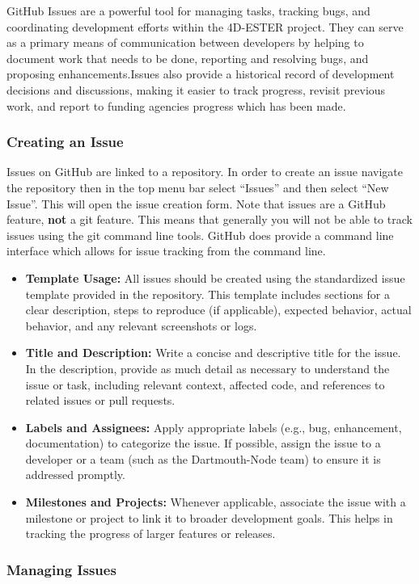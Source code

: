 \documentclass{ol-softwaremanual}
\begin{document}
GitHub Issues are a powerful tool for managing tasks, tracking bugs, and
coordinating development efforts within the 4D-ESTER project. They can serve as
a primary means of communication between developers by helping to document work
that needs to be done, reporting and resolving bugs, and proposing
enhancements.Issues also provide a historical record of development decisions
and discussions, making it easier to track progress, revisit previous work,
and report to funding agencies progress which has been made.

\subsubsection{Creating an Issue}
Issues on GitHub are linked to a repository. In order to create an issue
navigate the repository then in the top menu bar select ``Issues'' and then
select ``New Issue''. This will open the issue creation form. Note that issues
are a GitHub feature, \textbf{not} a git feature. This means that generally you
will not be able to track issues using the git command line tools. GitHub does
provide a command line interface which allows for issue tracking from the
command line.
\begin{itemize}
\item \textbf{Template Usage:} All issues should be created using the standardized issue template provided in the repository. This template includes sections for a clear description, steps to reproduce (if applicable), expected behavior, actual behavior, and any relevant screenshots or logs.
\item \textbf{Title and Description:} Write a concise and descriptive title for the issue. In the description, provide as much detail as necessary to understand the issue or task, including relevant context, affected code, and references to related issues or pull requests.
\item \textbf{Labels and Assignees:} Apply appropriate labels (e.g., bug, enhancement, documentation) to categorize the issue. If possible, assign the issue to a developer or a team (such as the Dartmouth-Node team) to ensure it is addressed promptly.
\item \textbf{Milestones and Projects:} Whenever applicable, associate the issue with a milestone or project to link it to broader development goals. This helps in tracking the progress of larger features or releases.
\end{itemize}

\subsubsection{Managing Issues}
\end{document}
